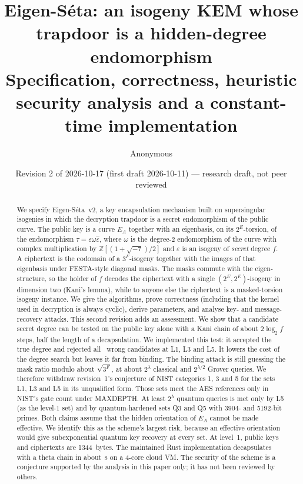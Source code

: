 \documentclass[11pt,a4paper]{article}
\title{Eigen-S\'eta: an isogeny KEM whose trapdoor is a hidden-degree endomorphism\\[0.3em]
\large Specification, correctness, heuristic security analysis and a constant-time implementation}
\author{Anonymous}
\date{Revision 2 of 2026-10-17 (first draft 2026-10-11) --- research draft, not peer reviewed}
\theoremstyle{definition}
\theoremstyle{remark}
\newcommand{\Z}{\mathbb{Z}}
\newcommand{\EA}{E_A}
\begin{document}
\maketitle

\begin{abstract}
We specify Eigen-S\'eta~v2, a key encapsulation mechanism built on supersingular
isogenies in which the decryption trapdoor is a secret endomorphism of the
public curve. The public key is a curve $\EA$ together with an eigenbasis, on
its $2^E$-torsion, of the endomorphism $\tau=\varepsilon\omega\hat\varepsilon$,
where $\omega$ is the degree-2 endomorphism of the curve with complex
multiplication by $\Z[(1+\sqrt{-7})/2]$ and $\varepsilon$ is an isogeny of
\emph{secret} degree $f$. A ciphertext is the codomain of a $3^{F}$-isogeny
together with the images of that eigenbasis under FESTA-style diagonal masks.
The masks commute with the eigen-structure, so the holder of $f$ decodes the
ciphertext with a single $(2^E,2^E)$-isogeny in dimension two (Kani's lemma),
while to anyone else the ciphertext is a masked-torsion isogeny instance.
We give the algorithms, prove correctness (including that the kernel used in
decryption is always cyclic), derive parameters, and analyse key- and
message-recovery attacks. This second revision adds an assessment. We show
that a candidate secret degree can be tested on the public key alone with a
Kani chain of about $2\log_2 f$ steps, half the length of a decapsulation.
We implemented this test: it accepted the true degree and rejected all
\PkWrongTested\ wrong candidates at L1, L3 and L5. It lowers the cost of the
degree search but leaves it far from binding. The binding attack is still
guessing the mask ratio modulo about $\sqrt{3^F}$, at about $2^\lambda$
classical and $2^{\lambda/2}$ Grover queries. We therefore withdraw
revision~1's conjecture of NIST categories 1, 3 and 5 for the sets L1, L3 and
L5 in its unqualified form. Those sets meet the AES references only in NIST's
gate count under MAXDEPTH. At least $2^\lambda$ quantum queries is met only by
L5 (as the level-1 set) and by quantum-hardened sets Q3 and Q5 with
3904- and 5192-bit primes. Both claims assume that the hidden orientation of
$\EA$ cannot be made effective. We identify this as the scheme's largest
risk, because an effective orientation would give subexponential quantum key
recovery at every set. At level~1, public keys and ciphertexts are
1344~bytes. The maintained Rust implementation decapsulates with a theta
chain in about \DecTimeOne\,s on a 4-core cloud VM. The security of the scheme
is a conjecture supported by the analysis in this paper only; it has not
been reviewed by others.
\end{abstract}

\tableofcontents














\end{document}
